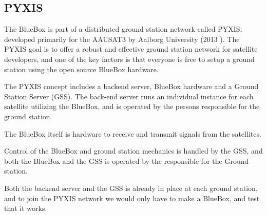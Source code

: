 \subsection{PYXIS}
The BlueBox is part of a distributed ground station network called PYXIS, developed primarily for the AAUSAT3 by Aalborg University (2013 \cite{aausat3}). The PYXIS goal is to offer a robust and effective ground station network for satellite developers, and one of the key factors is that everyone is free to setup a ground station using the open source BlueBox hardware. 

The PYXIS concept includes a backend server, BlueBox hardware and a Ground Station Server (GSS). The back-end server runs an individual instance for each satellite utilizing the BlueBox, and is operated by the persons responsible for the ground station. 

The BlueBox itself is hardware to receive and transmit signals from the satellites.

Control of the BlueBox and ground station mechanics is handled by the GSS, and both the BlueBox and the GSS is operated by the responsible for the Ground station. 

Both the backend server and the GSS is already in place at each ground station, and to join the PYXIS network we would only have to make a BlueBox, and test that it works.

